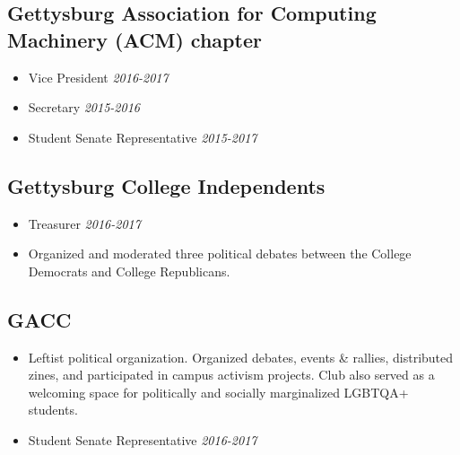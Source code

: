 \documentclass[11pt]{article}
\begin{document}
\subsection*{Gettysburg Association for Computing Machinery (ACM) chapter}
\begin{itemize}[noitemsep]
	\item Vice President \hfill \textit{2016-2017}
	\item Secretary \hfill \textit{2015-2016}
	\item Student Senate Representative \hfill \textit{2015-2017}
\end{itemize}
 
\subsection*{Gettysburg College Independents} 
\begin{itemize}[noitemsep]
	\item Treasurer \hfill \textit{2016-2017}
    \item Organized and moderated three political debates between the College Democrats and College Republicans. 
\end{itemize}

\subsection*{GACC}
\begin{itemize}[noitemsep]
    \item Leftist political organization. Organized debates, events \& rallies, distributed zines, and participated in campus activism projects. Club also served as a welcoming space for politically and socially marginalized LGBTQA+ students. 
    \item Student Senate Representative \hfill \textit{2016-2017}
\end{itemize}

\end{document}
